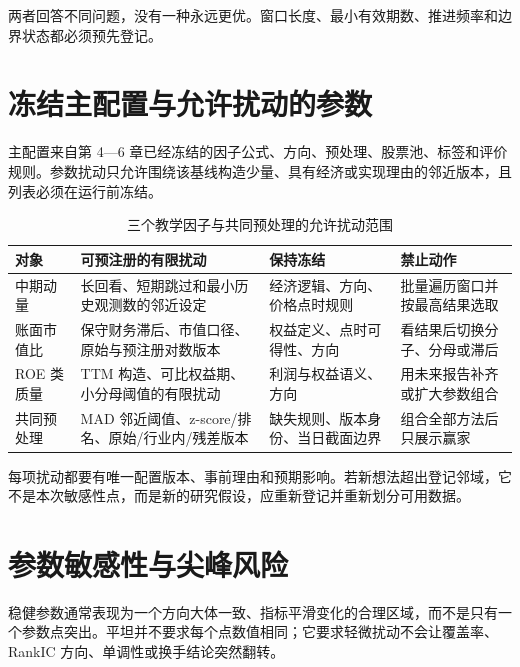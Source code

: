 两者回答不同问题，没有一种永远更优。窗口长度、最小有效期数、推进频率和边界状态都必须预先登记。

\section{冻结主配置与允许扰动的参数}

主配置来自第 4—6 章已经冻结的因子公式、方向、预处理、股票池、标签和评价规则。参数扰动只允许围绕该基线构造少量、具有经济或实现理由的邻近版本，且列表必须在运行前冻结。

\begin{table}[htbp]
  \centering
  \footnotesize
  \caption{三个教学因子与共同预处理的允许扰动范围}
  \label{tab:ch07-preregistered-perturbations}
  \begin{tabularx}{\textwidth}{p{2.3cm} p{4.4cm} Y Y}
    \toprule
    对象 & 可预注册的有限扰动 & 保持冻结 & 禁止动作 \\
    \midrule
    中期动量 & 长回看、短期跳过和最小历史观测数的邻近设定 & 经济逻辑、方向、价格点时规则 & 批量遍历窗口并按最高结果选取 \\
    账面市值比 & 保守财务滞后、市值口径、原始与预注册对数版本 & 权益定义、点时可得性、方向 & 看结果后切换分子、分母或滞后 \\
    ROE 类质量 & TTM 构造、可比权益期、小分母阈值的有限扰动 & 利润与权益语义、方向 & 用未来报告补齐或扩大参数组合 \\
    共同预处理 & MAD 邻近阈值、z-score/排名、原始/行业内/残差版本 & 缺失规则、版本身份、当日截面边界 & 组合全部方法后只展示赢家 \\
    \bottomrule
  \end{tabularx}
\end{table}

每项扰动都要有唯一配置版本、事前理由和预期影响。若新想法超出登记邻域，它不是本次敏感性点，而是新的研究假设，应重新登记并重新划分可用数据。

\section{参数敏感性与尖峰风险}

稳健参数通常表现为一个方向大体一致、指标平滑变化的合理区域，而不是只有一个参数点突出。平坦并不要求每个点数值相同；它要求轻微扰动不会让覆盖率、RankIC 方向、单调性或换手结论突然翻转。

